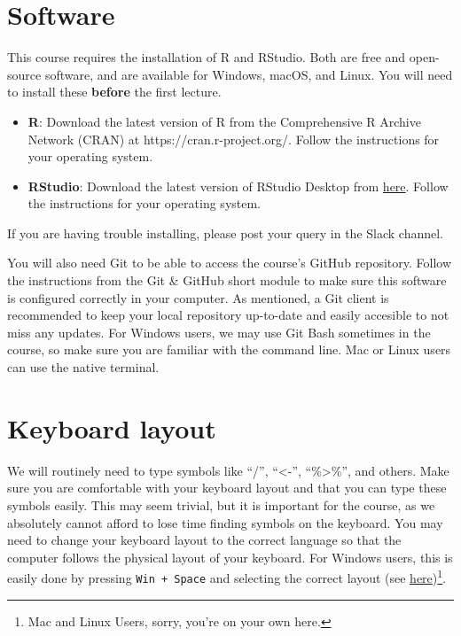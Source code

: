 \documentclass[
  letterpaper,
  DIV=11,
  numbers=noendperiod]{scrartcl}
\begin{document}
\section{Software}\label{software}

This course requires the installation of R and RStudio. Both are free
and open-source software, and are available for Windows, macOS, and
Linux. You will need to install these \textbf{before} the first lecture.

\begin{itemize}
\item
  \textbf{R}: Download the latest version of R from the Comprehensive R
  Archive Network (CRAN) at https://cran.r-project.org/. Follow the
  instructions for your operating system.
\item
  \textbf{RStudio}: Download the latest version of RStudio Desktop from
  \href{https://www.rstudio.com/products/rstudio/download/}{here}.
  Follow the instructions for your operating system.
\end{itemize}

If you are having trouble installing, please post your query in the
Slack channel.

You will also need Git to be able to access the course's GitHub
repository. Follow the instructions from the Git \& GitHub short module
to make sure this software is configured correctly in your computer. As
mentioned, a Git client is recommended to keep your local repository
up-to-date and easily accesible to not miss any updates. For Windows
users, we may use Git Bash sometimes in the course, so make sure you are
familiar with the command line. Mac or Linux users can use the native
terminal.

\section{Keyboard layout}\label{keyboard-layout}

We will routinely need to type symbols like ``/'', ``\textless-'',
``\%\textgreater\%'', and others. Make sure you are comfortable with
your keyboard layout and that you can type these symbols easily. This
may seem trivial, but it is important for the course, as we absolutely
cannot afford to lose time finding symbols on the keyboard. You may need
to change your keyboard layout to the correct language so that the
computer follows the physical layout of your keyboard. For Windows
users, this is easily done by pressing \texttt{Win\ +\ Space} and
selecting the correct layout (see
\href{https://support.microsoft.com/en-us/windows/change-your-keyboard-layout-245c49b8-f856-7fd7-2cf5-41e54c66f5b3}{here})\footnote{Mac
  and Linux Users, sorry, you're on your own here.}.
\end{document}
